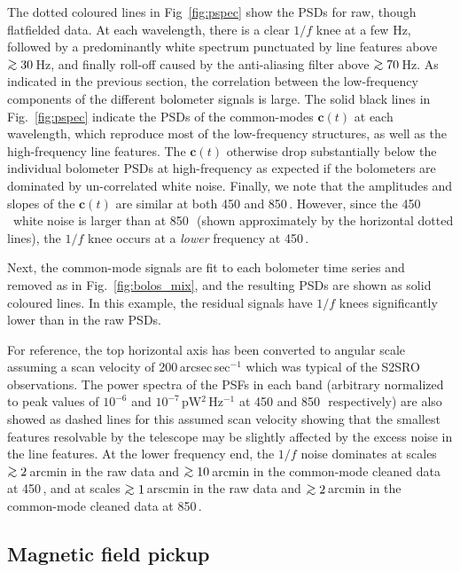 \documentclass[useAMS,usenatbib,nofootinbib]{mn2e}
\def\gsim{\mathrel{\lower2.5pt\vbox{\lineskip=0pt\baselineskip=0pt
          \hbox{$>$}\hbox{$\sim$}}}}
\begin{document}
The dotted coloured lines in Fig~\ref{fig:pspec} show the PSDs for
raw, though flatfielded data. At each wavelength, there is a clear
$1/f$ knee at a few Hz, followed by a predominantly white spectrum
punctuated by line features above $\gsim 30$\,Hz, and finally roll-off
caused by the anti-aliasing filter above $\gsim 70$\,Hz. As indicated
in the previous section, the correlation between the low-frequency
components of the different bolometer signals is large. The solid
black lines in Fig.~\ref{fig:pspec} indicate the PSDs of the
common-modes $\mathbf{c}(t)$ at each wavelength, which reproduce most
of the low-frequency structures, as well as the high-frequency line
features. The $\mathbf{c}(t)$ otherwise drop substantially below the
individual bolometer PSDs at high-frequency as expected if the
bolometers are dominated by un-correlated white noise. Finally, we
note that the amplitudes and slopes of the $\mathbf{c}(t)$ are similar
at both 450 and 850\,\micron. However, since the 450\,\micron\ white
noise is larger than at 850\,\micron\ (shown approximately by the
horizontal dotted lines), the $1/f$ knee occurs at a \emph{lower}
frequency at 450\,\micron.

Next, the common-mode signals are fit to each bolometer time series
and removed as in Fig.~\ref{fig:bolos_mix}, and the resulting PSDs are
shown as solid coloured lines. In this example, the residual signals
have $1/f$ knees significantly lower than in the raw PSDs.

For reference, the top horizontal axis has been converted to angular
scale assuming a scan velocity of 200\,arcsec\,sec$^{-1}$ which was
typical of the S2SRO observations. The power spectra of the PSFs in
each band (arbitrary normalized to peak values of $10^{-6}$ and
$10^{-7}$\,pW$^2$\,Hz$^{-1}$ at 450 and 850\,\micron\ respectively)
are also showed as dashed lines for this assumed scan velocity showing
that the smallest features resolvable by the telescope may be slightly
affected by the excess noise in the line features. At the lower
frequency end, the $1/f$ noise dominates at scales $\gsim 2$\,arcmin
in the raw data and $\gsim 10$\,arcmin in the common-mode cleaned data
at 450\,\micron, and at scales $\gsim 1$\,arscmin in the raw data and
$\gsim 2$\,arcmin in the common-mode cleaned data at 850\,\micron.

\subsection{Magnetic field pickup}
\label{sec:magpickup}
\end{document}
